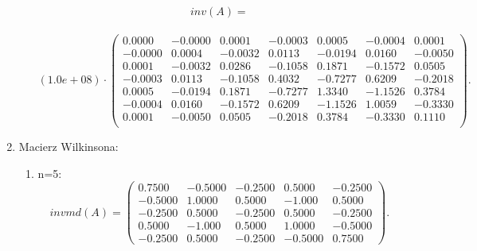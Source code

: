 \documentclass[12pt]{article}
\begin{document}
\begin{enumerate}
\begin{enumerate}
\newpage
\[
inv(A)=
\]
\\
\[
\left(1.0e+08\right) \cdot \begin{pmatrix}
0.0000 & -0.0000 & 0.0001 & -0.0003 & 0.0005 & -0.0004 & 0.0001 \\
-0.0000 & 0.0004 & -0.0032 & 0.0113 & -0.0194 & 0.0160 & -0.0050 \\
0.0001 & -0.0032 & 0.0286 & -0.1058 & 0.1871 & -0.1572 & 0.0505 \\
-0.0003 & 0.0113 & -0.1058 & 0.4032 & -0.7277 & 0.6209 & -0.2018 \\
0.0005 & -0.0194  & 0.1871 & -0.7277 & 1.3340 & -1.1526 & 0.3784 \\
-0.0004 & 0.0160 & -0.1572 & 0.6209 & -1.1526 & 1.0059 & -0.3330\\
0.0001 & -0.0050 & 0.0505 & -0.2018 & 0.3784 & -0.3330 & 0.1110\\
\end{pmatrix}.
\]
\end{enumerate}
\item Macierz Wilkinsona:
\begin{enumerate}
\item n=5:
\[
invmd(A)=\begin{pmatrix}
0.7500 & -0.5000 & -0.2500 & 0.5000 & -0.2500 \\
-0.5000 & 1.0000 & 0.5000 & -1.000 & 0.5000 \\
-0.2500 & 0.5000 & -0.2500 & 0.5000 & -0.2500 \\
0.5000 & -1.000 & 0.5000 & 1.0000 & -0.5000 \\
-0.2500 & 0.5000  & -0.2500 & -0.5000 & 0.7500
\end{pmatrix}.
\]


\end{enumerate}
\end{enumerate}
\end{document}
